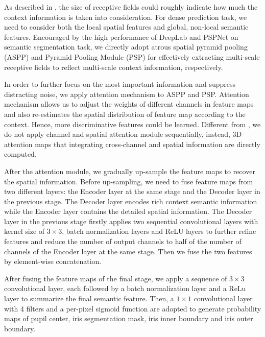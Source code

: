 \documentclass[journal]{IEEEtran}
\begin{document}
As described in \cite{zhao2017pyramid}, the size of receptive fields could roughly indicate how much the context information is taken into consideration. For dense prediction task, we need to consider both the local spatial features and global, non-local semantic features. Encouraged by the high performance of DeepLab\cite{chen2017rethinking} and PSPNet\cite{zhao2017pyramid} on semantic segmentation task, we directly adopt atrous spatial pyramid pooling (ASPP) and Pyramid Pooling Module (PSP) for effectively extracting multi-scale receptive fields to reflect multi-scale context information, respectively.

In order to further focus on the most important information and suppress distracting noise, we apply attention mechanism to ASPP and PSP.
Attention mechanism allows us to adjust the weights of different channels in feature maps and also re-estimates the spatial distribution of feature map according to the context\cite{Mnih2014Recurrent,Wang2017Residual,yu2018learning,Woo2018CBAM,Park2018BAM}. Hence, more discriminative features could be learned. Different from \cite{Woo2018CBAM}, we do not apply channel and spatial attention module sequentially, instead, 3D attention maps that integrating cross-channel and spatial information are directly computed.

After the attention module, we gradually up-sample the feature maps to recover the spatial information. Before up-sampling, we need to fuse feature maps from two different layers: the Encoder layer at the same stage and the Decoder layer in the previous stage. The Decoder layer encodes rich context semantic information while the Encoder layer contains the detailed spatial information. The Decoder layer in the previous stage firstly applies two sequential convolutional layers with kernel size of $3\times3$, batch normalization layers and ReLU layers to further refine features and reduce the number of output channels to half of the number of channels of the Encoder layer at the same stage. Then we fuse the two features by element-wise concatenation.

After fusing the feature maps of the final stage, we apply a sequence of $3\times3$ convolutional layer, each followed by a batch normalization layer and a ReLu layer to summarize the final semantic feature. Then, a $1\times1$ convolutional layer with 4 filters and a per-pixel sigmoid function are adopted to generate probability maps of pupil center, iris segmentation mask, iris inner boundary and iris outer boundary.
\end{document}
